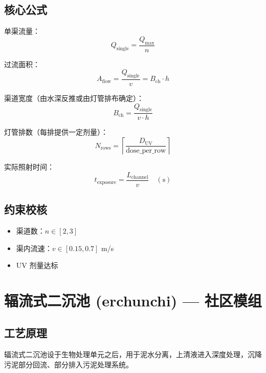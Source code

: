 \documentclass[12pt,a4paper]{ctexart}
\begin{document}
\subsection{核心公式}
单渠流量：
\begin{equation}
Q_{\text{single}} = \frac{Q_{\text{max}}}{n}
\end{equation}

过流面积：
\begin{equation}
A_{\text{flow}} = \frac{Q_{\text{single}}}{v} = B_{\text{ch}} \cdot h
\end{equation}

渠道宽度（由水深反推或由灯管排布确定）：
\begin{equation}
B_{\text{ch}} = \frac{Q_{\text{single}}}{v \cdot h}
\end{equation}

灯管排数（每排提供一定剂量）：
\begin{equation}
N_{\text{rows}} = \left\lceil \frac{D_{\text{UV}}}{\text{dose\_per\_row}} \right\rceil
\end{equation}

实际照射时间：
\begin{equation}
t_{\text{exposure}} = \frac{L_{\text{channel}}}{v} \quad (\text{s})
\end{equation}

\subsection{约束校核}
\begin{itemize}
  \item 渠道数：$n \in [2, 3]$
  \item 渠内流速：$v \in [0.15, 0.7]$ m/s
  \item UV 剂量达标
\end{itemize}

\section{辐流式二沉池 (erchunchi) — 社区模组}

\subsection{工艺原理}
辐流式二沉池设于生物处理单元之后，用于泥水分离，上清液进入深度处理，沉降污泥部分回流、部分排入污泥处理系统。
\end{document}
